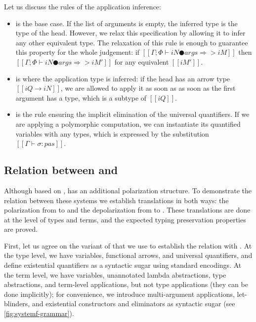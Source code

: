 Let us discuss the rules of the application inference:
\begin{itemize}
  \item {} 
    is the base case. If the list of arguments is empty, 
    the inferred type is the type of the head. 
    However, we relax this specification by allowing it to 
    infer any other equivalent type. 
    The relaxation of this rule is enough to guarantee 
    this property for the whole judgement:
    if $[[Γ ; Φ ⊢ iN ● args ⇒> iM]]$ then 
    $[[Γ ; Φ ⊢ iN ● args ⇒> iM']]$ for any equivalent 
    $[[iM']]$.
  \item {}
    is where the application type is inferred: 
    if the head has an arrow type $[[iQ → iN]]$,
     we are allowed to apply it as soon as 
    as soon as the first argument has a type, which is a subtype of $[[iQ]]$.
  \item {}
    is the rule ensuring the implicit elimination of the universal quantifiers. 
    If we are applying a polymorphic computation, 
    we can instantiate its quantified variables with any types,
    which is expressed by the substitution $[[Γ ⊢ σ : {pas}]]$.
\end{itemize}

\subsection{Relation between \fexists and \systemf}

Although based on \systemf, \fexists has an additional polarization structure.
To demonstrate the relation between these systems we establish translations in
both ways: the polarization from \systemf to \fexists and the depolarization
from \fexists to \systemf. These translations are done at the level of types and
terms, and the expected typing preservation properties are proved.

First, let us agree on the variant of \systemf that we use to establish the
relation with \fexists. At the type level, we have variables, functional arrows,
and universal quantifiers, and define existential quantifiers as a syntactic
sugar using standard encodings. At the term level, we have variables,
unannotated lambda abstractions, type abstractions, and term-level applications,
but not type applications (they can be done implicitly); for convenience, we
introduce multi-argument applications, let-blinders, and existential constructors
and eliminators as syntactic sugar (see \cref{fig:systemf-grammar}).

